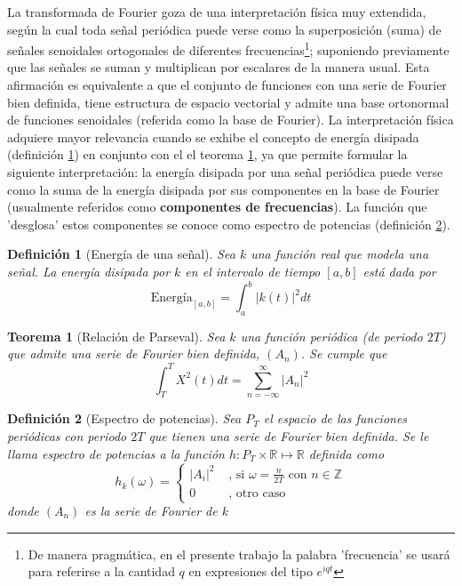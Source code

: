\documentclass[12pt,a4paper]{mitthesis}
\newtheorem{defn}{Definici\'on}
\newtheorem{thrm}{Teorema}
\newcommand{\abso}[1]{\left| #1 \right|}
\begin{document}
La transformada de Fourier goza de una interpretaci\'on f\'isica muy extendida, seg\'un la cual 
toda se\~nal peri\'odica puede verse como la superposici\'on (suma) de se\~nales senoidales 
ortogonales de diferentes frecuencias\footnote{De manera pragm\'atica, en el presente trabajo la 
palabra  'frecuencia' se usar\'a para referirse a la cantidad $q$ en expresiones del tipo 
$e^{i q t}$}; suponiendo previamente que las se\~nales se suman y multiplican por escalares de la 
manera usual. 
Esta afirmaci\'on es equivalente a que el conjunto de funciones con una serie de Fourier bien 
definida, tiene estructura de espacio vectorial y admite una base ortonormal de funciones 
senoidales (referida como la base de Fourier). 
La interpretaci\'on f\'isica adquiere mayor relevancia cuando se exhibe el concepto de energ\'ia
disipada (definici\'on \ref{energia}) en conjunto con el el teorema \ref{parseval_serie}, ya que 
permite formular la siguiente interpretaci\'on: la energ\'ia disipada por una se\~nal peri\'odica 
puede verse como la suma de la energ\'ia disipada por sus componentes en la base de Fourier 
(usualmente referidos como \textbf{componentes de frecuencias}).
La funci\'on que 'desglosa' estos componentes se conoce como espectro de potencias (definici\'on 
\ref{espec}).

\begin{defn}[Energ\'ia de una se\~nal]
Sea $k$ una funci\'on real que modela una se\~nal. La energ\'ia disipada por $k$ en el intervalo de
tiempo $[a,b]$ est\'a dada por
\begin{equation*}
\text{Energ\'ia}_{[a,b]} = \int_{a}^{b} \abso{k\left(t\right)}^{2} dt
\end{equation*}
\label{energia}
\end{defn}

\begin{thrm}[Relaci\'on de Parseval]
Sea $k$ una funci\'on peri\'odica (de periodo $2T$) que admite una serie de Fourier bien definida,
$(A_n)$. Se cumple que
\begin{equation*}
\int_T^{T} X^{2}(t) dt = \sum_{n=-\infty}^{\infty} \abso{A_n}^{2}
\end{equation*}
\label{parseval_serie}
\end{thrm}

\newpage

\begin{defn}[Espectro de potencias]
Sea $P_T$ el espacio de las funciones peri\'odicas con periodo $2T$ que tienen una serie de Fourier 
bien definida. Se le llama espectro de potencias a la funci\'on 
$h: P_T \times \mathbb{R} \mapsto \mathbb{R}$ definida como
\begin{equation*}
h_k(\omega) = 
\begin{cases}
\abso{A_i}^{2} & \text{ , si } \omega = \frac{n}{2T} \text{   con } n\in \mathbb{Z} \\
0 & \text{ ,  otro caso}
\end{cases}
\end{equation*}
donde $\left( A_n \right)$ es la serie de Fourier de $k$
\label{espec}
\end{defn}
\end{document}
